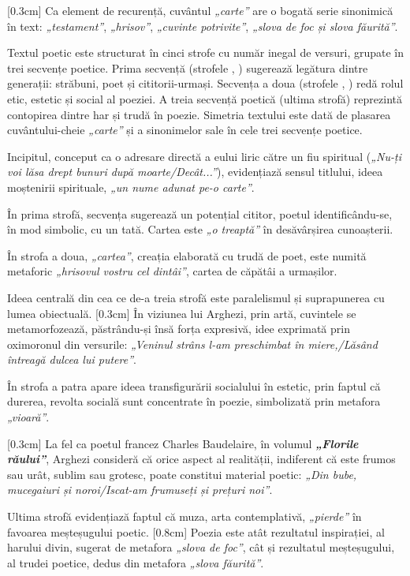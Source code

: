 \documentclass[
12pt,
a4paper
]{article}
\newcommand{\rom}[1]{\uppercase\expandafter{\romannumeral #1\relax}} %
\begin{document}
[0.3cm]
Ca element de recurență, cuvântul \textit{„carte”} are o bogată serie sinonimică în text: \textit{„testament”}, \textit{„hrisov”}, \textit{„cuvinte potrivite”}, \textit{„slova de foc și slova făurită”}.

Textul poetic este structurat în cinci strofe cu număr inegal de versuri, grupate în trei secvențe poetice. Prima secvență (strofele \rom{1}, \rom{2}) sugerează legătura dintre generații: străbuni, poet și cititorii-urmași. Secvența a doua (strofele \rom{3}, \rom{4}) redă rolul etic, estetic și social al poeziei. A treia secvență poetică (ultima strofă) reprezintă contopirea dintre har și trudă în poezie. Simetria textului este dată de plasarea cuvântului-cheie \textit{„carte”} și a sinonimelor sale în cele trei secvențe poetice.

Incipitul, conceput ca o adresare directă a eului liric către un fiu spiritual (\textit{„Nu-ți voi lăsa drept bunuri după moarte/Decât...”}), evidențiază sensul titlului, ideea moștenirii spirituale, \textit{„un nume adunat pe-o carte”}.

În prima strofă, secvența sugerează un potențial cititor, poetul identificându-se, în mod simbolic, cu un tată. Cartea este \textit{„o treaptă”} în desăvârșirea cunoașterii.

În strofa a doua, \textit{„cartea”}, creația elaborată cu trudă de poet, este numită metaforic \textit{„hrisovul vostru cel dintâi”}, cartea de căpătâi a urmașilor.

Ideea centrală din cea ce de-a treia strofă este paralelismul și suprapunerea cu lumea obiectuală.
[0.3cm]
În viziunea lui Arghezi, prin artă, cuvintele se metamorfozează, păstrându-și însă forța expresivă, idee exprimată prin oximoronul din versurile: \textit{„Veninul strâns l-am preschimbat în miere,/Lăsând întreagă dulcea lui putere”}.

În strofa a patra apare ideea transfigurării socialului în estetic, prin faptul că durerea, revolta socială sunt concentrate în poezie, simbolizată prin metafora \textit{„vioară”}.

[0.3cm]
La fel ca poetul francez Charles Baudelaire, în volumul \textbf{\textit{„Florile răului”}}, Arghezi consideră că orice aspect al realității, indiferent că este frumos sau urât, sublim sau grotesc, poate constitui material poetic: \textit{„Din bube, mucegaiuri și noroi/Iscat-am frumuseți și prețuri noi”}.

Ultima strofă evidențiază faptul că muza, arta contemplativă, \textit{„pierde”} în favoarea meșteșugului poetic.
[0.8cm]
Poezia este atât rezultatul inspirației, al harului divin, sugerat de metafora \textit{„slova de foc”}, cât și rezultatul meșteșugului, al trudei poetice, dedus din metafora \textit{„slova făurită”}.
\end{document}
